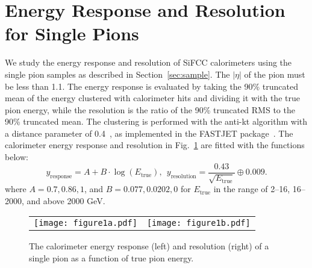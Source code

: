 \documentclass{PoS}
\begin{document}
\section{Energy Response and Resolution for Single Pions}
We study the energy response and resolution of SiFCC calorimeters using the 
single pion samples as described in Section~\ref{sec:sample}. The $\left|\eta\right|$ of the pion must be less than 1.1. The energy 
response is evaluated by taking the 90\% truncated mean of the energy 
clustered with calorimeter hits and dividing it with the true pion energy, 
while the resolution is the ratio of the 90\% truncated RMS to 
the 90\% truncated mean. 
The clustering is performed with the anti-kt algorithm with a distance 
parameter of 0.4~\cite{Cacciari:2008gp}, as implemented in the \textsc{FASTJET} 
package~\cite{fastjet}. 
The calorimeter energy response and resolution in 
Fig.~\ref{fig:piresponse} are fitted with the functions below:
\begin{equation}
 y_\mathrm{response} = A + B\cdot\log\left(E_\mathrm{true}\right), ~~y_\mathrm{resolution} = \frac{0.43}{\sqrt{E_\mathrm{true}}} \oplus 0.009.
\label{eq:response}
\end{equation}
where $A=0.7,0.86,1$, and $B=0.077,0.0202,0$ for $E_\mathrm{true}$ in the 
range of 2--16, 16--2000, and above 2000 GeV. 


\begin{figure}
\begin{center}
\begin{tabular}{cc}
\texttt{[image: figure1a.pdf]} & 
\texttt{[image: figure1b.pdf]}\\
\end{tabular}
\end{center}
\caption{The calorimeter energy response (left) and resolution (right) of a 
single pion as a function of true pion energy. %
}
\label{fig:piresponse}
\end{figure}
\end{document}
